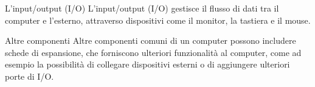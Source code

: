\begin{frame}
	
	\begin{block}{L'input/output (I/O)} 
		L'input/output (I/O) gestisce il flusso di dati tra il computer e l'esterno, attraverso dispositivi come il monitor, la tastiera e il mouse.
	\end{block}
	
	 
\end{frame}


\begin{frame}
	
	\begin{block}{Altre componenti}
		Altre componenti comuni di un computer possono includere schede di espansione, che forniscono ulteriori funzionalità al computer, come ad esempio la possibilità di collegare dispositivi esterni o di aggiungere ulteriori porte di I/O.
	\end{block}
	
	
\end{frame}



